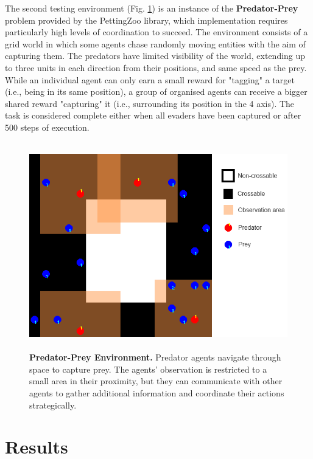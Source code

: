 \documentclass[a4paper,singleside,12pt]{report} %
\begin{document}
The second testing environment (Fig. \ref{fig:pursuit}) is an instance of the \textbf{Predator-Prey} problem provided by the PettingZoo library, which implementation requires particularly high levels of coordination to succeed. The environment consists of a grid world in which some agents chase randomly moving entities with the aim of capturing them. The predators have limited visibility of the world, extending up to three units in each direction from their positions, and same speed as the prey. While an individual agent can only earn a small reward for "tagging" a target (i.e., being in its same position), a group of organised agents can receive a bigger shared reward "capturing" it (i.e., surrounding its position in the 4 axis). The task is considered complete either when all evaders have been captured or after 500 steps of execution.

\begin{figure}
  \centering
  \includegraphics[height=9cm]{images/pursuit.png}
  \caption{\textbf{Predator-Prey Environment.} Predator agents navigate through space to capture prey. The agents' observation is restricted to a small area in their proximity, but they can communicate with other agents to gather additional information and coordinate their actions strategically.}
  \label{fig:pursuit}
\end{figure}


\section{Results}\label{results}
\end{document}
